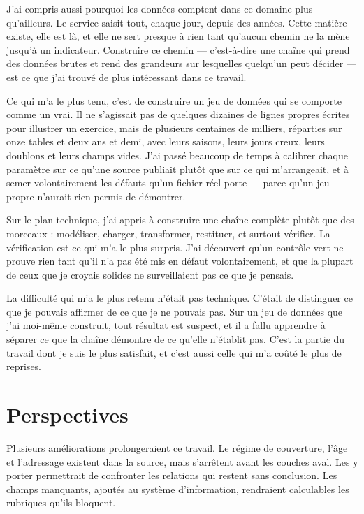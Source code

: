 J'ai compris aussi pourquoi les données comptent dans ce domaine plus qu'ailleurs. Le service
saisit tout, chaque jour, depuis des années. Cette matière existe, elle est là, et elle ne sert
presque à rien tant qu'aucun chemin ne la mène jusqu'à un indicateur. Construire ce chemin —
c'est-à-dire une chaîne qui prend des données brutes et rend des grandeurs sur lesquelles quelqu'un
peut décider — est ce que j'ai trouvé de plus intéressant dans ce travail.

Ce qui m'a le plus tenu, c'est de construire un jeu de données qui se comporte comme un vrai. Il ne
s'agissait pas de quelques dizaines de lignes propres écrites pour illustrer un exercice, mais de
plusieurs centaines de milliers, réparties sur onze tables et deux ans et demi, avec leurs saisons,
leurs jours creux, leurs doublons et leurs champs vides. J'ai passé beaucoup de temps à calibrer
chaque paramètre sur ce qu'une source publiait plutôt que sur ce qui m'arrangeait, et à semer
volontairement les défauts qu'un fichier réel porte — parce qu'un jeu propre n'aurait rien permis
de démontrer.

Sur le plan technique, j'ai appris à construire une chaîne complète plutôt que des morceaux :
modéliser, charger, transformer, restituer, et surtout vérifier. La vérification est ce qui m'a le
plus surpris. J'ai découvert qu'un contrôle vert ne prouve rien tant qu'il n'a pas été mis en
défaut volontairement, et que la plupart de ceux que je croyais solides ne surveillaient pas ce que je
pensais.

La difficulté qui m'a le plus retenu n'était pas technique. C'était de distinguer ce que je pouvais
affirmer de ce que je ne pouvais pas. Sur un jeu de données que j'ai moi-même construit, tout
résultat est suspect, et il a fallu apprendre à séparer ce que la chaîne démontre de ce qu'elle
n'établit pas. C'est la partie du travail dont je suis le plus satisfait, et c'est aussi celle qui
m'a coûté le plus de reprises.

\section*{Perspectives}

Plusieurs améliorations prolongeraient ce travail. Le régime de couverture, l'âge et l'adressage
existent dans la source, mais s'arrêtent avant les couches aval. Les y porter permettrait de
confronter les relations qui restent sans conclusion. Les  champs manquants, ajoutés au système
d'information, rendraient calculables les rubriques qu'ils bloquent.


